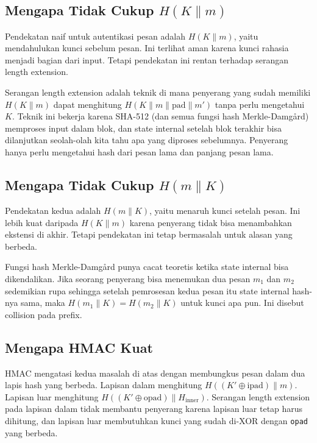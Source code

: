 \documentclass[11pt,a4paper]{article}
\begin{document}
\subsection{Mengapa Tidak Cukup $H(K \parallel m)$}

Pendekatan naif untuk autentikasi pesan adalah $H(K \parallel m)$, yaitu mendahulukan kunci sebelum pesan. Ini terlihat aman karena kunci rahasia menjadi bagian dari input. Tetapi pendekatan ini rentan terhadap serangan length extension.

Serangan length extension adalah teknik di mana penyerang yang sudah memiliki $H(K \parallel m)$ dapat menghitung $H(K \parallel m \parallel \text{pad} \parallel m')$ tanpa perlu mengetahui $K$. Teknik ini bekerja karena SHA-512 (dan semua fungsi hash Merkle-Damgård) memproses input dalam blok, dan state internal setelah blok terakhir bisa dilanjutkan seolah-olah kita tahu apa yang diproses sebelumnya. Penyerang hanya perlu mengetahui hash dari pesan lama dan panjang pesan lama.

\subsection{Mengapa Tidak Cukup $H(m \parallel K)$}

Pendekatan kedua adalah $H(m \parallel K)$, yaitu menaruh kunci setelah pesan. Ini lebih kuat daripada $H(K \parallel m)$ karena penyerang tidak bisa menambahkan ekstensi di akhir. Tetapi pendekatan ini tetap bermasalah untuk alasan yang berbeda.

Fungsi hash Merkle-Damgård punya cacat teoretis ketika state internal bisa dikendalikan. Jika seorang penyerang bisa menemukan dua pesan $m_1$ dan $m_2$ sedemikian rupa sehingga setelah pemrosesan kedua pesan itu state internal hash-nya sama, maka $H(m_1 \parallel K) = H(m_2 \parallel K)$ untuk kunci apa pun. Ini disebut collision pada prefix.

\subsection{Mengapa HMAC Kuat}

HMAC mengatasi kedua masalah di atas dengan membungkus pesan dalam dua lapis hash yang berbeda. Lapisan dalam menghitung $H((K' \oplus \text{ipad}) \parallel m)$. Lapisan luar menghitung $H((K' \oplus \text{opad}) \parallel H_{\text{inner}})$. Serangan length extension pada lapisan dalam tidak membantu penyerang karena lapisan luar tetap harus dihitung, dan lapisan luar membutuhkan kunci yang sudah di-XOR dengan \texttt{opad} yang berbeda.
\end{document}
